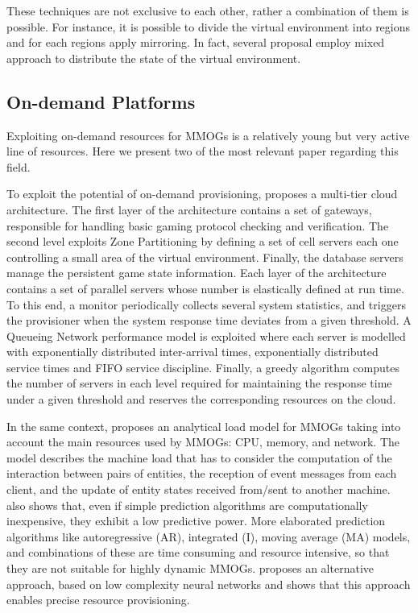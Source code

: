 \documentclass[final,10pt,a5paper]{phdimt}
\theoremstyle{definition}
\begin{document}
These techniques are not exclusive to each other, rather a combination of them is possible. For instance, it is possible to divide the virtual environment into regions and for each regions apply mirroring. In fact, several proposal employ mixed approach to distribute the state of the virtual environment.



\subsection{On-demand Platforms}
\label{cloud}

Exploiting on-demand resources for MMOGs is a relatively young but very active line of resources.
Here we present two of the most relevant paper regarding this field.

To exploit the potential of on-demand provisioning, \cite{Marzolla} proposes a multi-tier cloud architecture. The first layer of the architecture contains a set of gateways, responsible for handling basic gaming protocol
checking and verification. The second level exploits Zone Partitioning by defining a set of cell servers each one  controlling a small area of the virtual environment.
Finally, the database servers manage the persistent game state information. Each layer of the architecture contains a set of parallel servers whose number is elastically defined at run time.
To this end, a monitor periodically collects several system statistics, and triggers the provisioner when the system response time deviates from a given threshold. A Queueing Network performance model is exploited where each server is modelled  with exponentially distributed inter-arrival times, exponentially distributed service times and FIFO service discipline. Finally, a greedy algorithm computes the number of servers in each level required for maintaining the response time under a given threshold and reserves the corresponding resources on the cloud.


In the same context, \cite{IosupTPDS} proposes an analytical load model
for MMOGs taking into account the main resources used by MMOGs: CPU, memory, and network. 
The model describes the machine load that has to consider the computation of the interaction
between pairs of entities, the reception of event messages from each client, and the update of entity states received from/sent to another machine.
\cite{IosupTPDS} also shows that, even if simple prediction algorithms are computationally inexpensive,
they exhibit a low predictive power. More elaborated prediction algorithms like autoregressive (AR), integrated (I), moving
average (MA) models, and combinations of these are time consuming and resource intensive, so that they are
not suitable for highly dynamic MMOGs. \cite{IosupTPDS} proposes an alternative approach, based on low complexity neural networks and shows that this approach enables precise resource provisioning.
\end{document}
